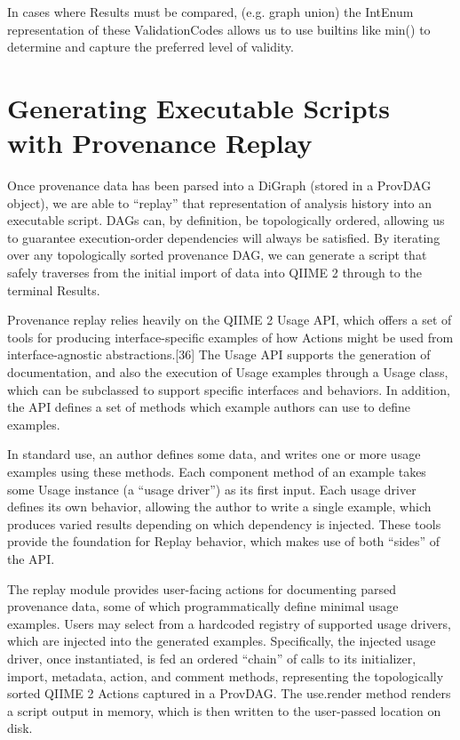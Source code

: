 \noindent In cases where Results must be compared, (e.g. graph union) the IntEnum
representation of these ValidationCodes allows us to use builtins like min() to
determine and capture the preferred level of validity.

\section{Generating Executable Scripts with Provenance Replay}

Once provenance data has been parsed into a DiGraph (stored in a ProvDAG
object), we are able to “replay” that representation of analysis history into an
executable script. DAGs can, by definition, be topologically ordered, allowing
us to guarantee execution-order dependencies will always be satisfied. By
iterating over any topologically sorted provenance DAG, we can generate a script
that safely traverses from the initial import of data into QIIME 2 through to
the terminal Results.

Provenance replay relies heavily on the QIIME 2 Usage API, which offers a set of
tools for producing interface-specific examples of how Actions might be used
from interface-agnostic abstractions.[36] The Usage API supports the generation
of documentation, and also the execution of Usage examples through a Usage
class, which can be subclassed to support specific interfaces and behaviors. In
addition, the API defines a set of methods which example authors can use to
define examples. 

In standard use, an author defines some data, and writes one or more usage
examples using these methods. Each component method of an example takes some
Usage instance (a “usage driver”) as its first input. Each usage driver defines
its own behavior, allowing the author to write a single example, which produces
varied results depending on which dependency is injected. These tools provide
the foundation for Replay behavior, which makes use of both “sides” of the API. 

The replay module provides user-facing actions for documenting parsed provenance
data, some of which programmatically define minimal usage examples. Users may
select from a hardcoded registry of supported usage drivers, which are injected
into the generated examples. Specifically, the injected usage driver, once
instantiated, is fed an ordered “chain” of calls to its initializer, import,
metadata, action, and comment methods, representing the topologically sorted
QIIME 2 Actions captured in a ProvDAG. The use.render method renders a script
output in memory, which is then written to the user-passed location on disk.


